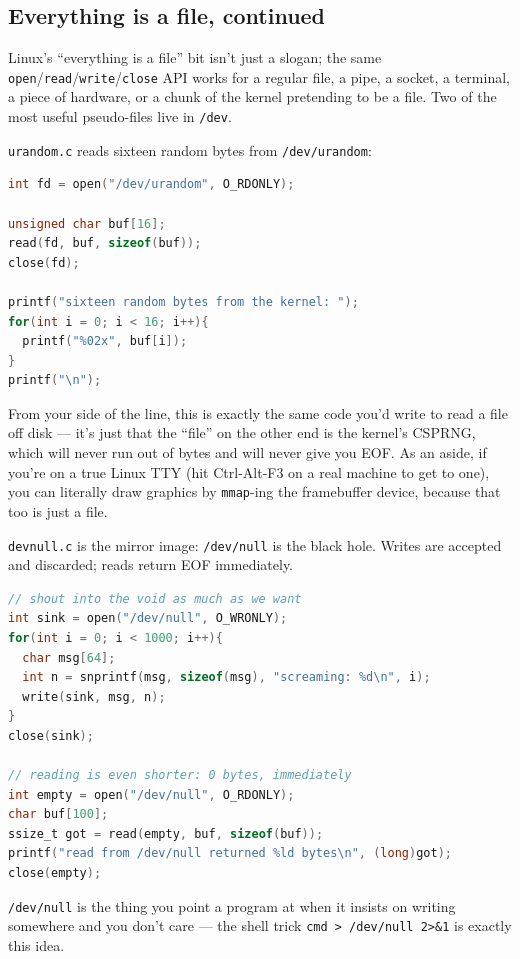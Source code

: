 \documentclass[11pt]{article}
\begin{document}
\subsection*{Everything is a file, continued}

Linux's ``everything is a file'' bit isn't just a slogan; the same
\texttt{open}/\texttt{read}/\texttt{write}/\texttt{close} API works
for a regular file, a pipe, a socket, a terminal, a piece of
hardware, or a chunk of the kernel pretending to be a file. Two of
the most useful pseudo-files live in \texttt{/dev}.

\texttt{urandom.c} reads sixteen random bytes from
\texttt{/dev/urandom}:

\begin{lstlisting}[language=C]
int fd = open("/dev/urandom", O_RDONLY);

unsigned char buf[16];
read(fd, buf, sizeof(buf));
close(fd);

printf("sixteen random bytes from the kernel: ");
for(int i = 0; i < 16; i++){
  printf("%02x", buf[i]);
}
printf("\n");
\end{lstlisting}

From your side of the line, this is exactly the same code you'd
write to read a file off disk --- it's just that the ``file'' on the
other end is the kernel's CSPRNG, which will never run out of bytes
and will never give you EOF. As an aside, if you're on a true Linux
TTY (hit Ctrl-Alt-F3 on a real machine to get to one), you can
literally draw graphics by \texttt{mmap}-ing the framebuffer device,
because that too is just a file.

\texttt{devnull.c} is the mirror image: \texttt{/dev/null} is the
black hole. Writes are accepted and discarded; reads return EOF
immediately.

\begin{lstlisting}[language=C]
// shout into the void as much as we want
int sink = open("/dev/null", O_WRONLY);
for(int i = 0; i < 1000; i++){
  char msg[64];
  int n = snprintf(msg, sizeof(msg), "screaming: %d\n", i);
  write(sink, msg, n);
}
close(sink);

// reading is even shorter: 0 bytes, immediately
int empty = open("/dev/null", O_RDONLY);
char buf[100];
ssize_t got = read(empty, buf, sizeof(buf));
printf("read from /dev/null returned %ld bytes\n", (long)got);
close(empty);
\end{lstlisting}

\texttt{/dev/null} is the thing you point a program at when it
insists on writing somewhere and you don't care --- the shell trick
\texttt{cmd > /dev/null 2>\&1} is exactly this idea.
\end{document}
